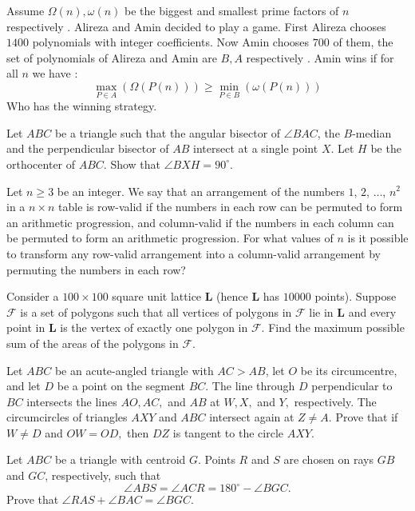 \documentclass[11pt]{scrartcl}
\begin{document}
\begin{problem}[264341061776385]
	Assume $\Omega(n),\omega(n)$ be the biggest and smallest prime factors of $n$ respectively . Alireza and Amin decided to play a game. First Alireza chooses $1400$ polynomials with integer coefficients. Now Amin chooses $700$ of them, the set of polynomials of Alireza and Amin are $B,A$ respectively . Amin wins if for all $n$ we have :
$$\max_{P \in A}(\Omega(P(n))) \ge \min_{P \in B}(\omega(P(n)))$$Who has the winning strategy.
\end{problem}
\begin{problem}[264456837378391]
Let $ABC$ be a triangle such that the angular bisector of $\angle BAC$, the $B$-median and the perpendicular bisector of $AB$ intersect at a single point $X$. Let $H$ be the orthocenter of $ABC$. Show that $\angle BXH = 90^{\circ}$.
\end{problem}
\begin{problem}[274933009357884]
Let $n\geq3$ be an integer. We say that an arrangement of the numbers $1$, $2$, $\dots$, $n^2$ in a $n \times n$ table is row-valid if the numbers in each row can be permuted to form an arithmetic progression, and column-valid if the numbers in each column can be permuted to form an arithmetic progression. For what values of $n$ is it possible to transform any row-valid arrangement into a column-valid arrangement by permuting the numbers in each row?
\end{problem}
\begin{problem}[275429739915708]
Consider a $100\times 100$ square unit lattice $\textbf{L}$ (hence $\textbf{L}$ has $10000$ points). Suppose $\mathcal{F}$ is a set of polygons such that all vertices of polygons in $\mathcal{F}$ lie in $\textbf{L}$ and every point in $\textbf{L}$ is the vertex of exactly one polygon in $\mathcal{F}.$ Find the maximum possible sum of the areas of the polygons in $\mathcal{F}.$
\end{problem}
\begin{problem}[282712203118607]
	Let $ABC$ be an acute-angled triangle with $AC > AB$, let $O$ be its circumcentre, and let $D$ be a point on the segment $BC$. The line through $D$ perpendicular to $BC$ intersects the lines $AO, AC,$ and $AB$ at $W, X,$ and $Y,$ respectively. The circumcircles of triangles $AXY$ and $ABC$ intersect again at $Z \ne A$.
Prove that if $W \ne D$ and $OW = OD,$ then $DZ$ is tangent to the circle $AXY.$
\end{problem}
\begin{problem}[284109588966873]
	Let $ABC$ be a triangle with centroid $G$. Points $R$ and $S$ are chosen on rays $GB$ and $GC$, respectively, such that
\[ \angle ABS=\angle ACR=180^\circ-\angle BGC.\]Prove that $\angle RAS+\angle BAC=\angle BGC$.
\end{problem}
\end{document}

